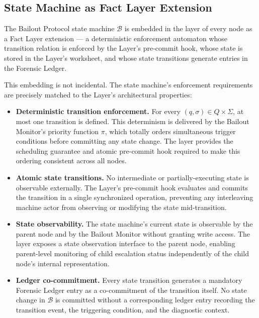 \subsection{State Machine as Fact Layer Extension}\label{sec:bailout-fml}

The Bailout Protocol state machine $\mathcal{B}$ is embedded in the \fact{} layer of every \bxthree{} node as a Fact Layer extension --- a deterministic enforcement automaton whose transition relation is enforced by the \fact{} Layer's pre-commit hook, whose state is stored in the \fact{} Layer's worksheet, and whose state transitions generate entries in the Forensic Ledger.

This embedding is not incidental. The state machine's enforcement requirements are precisely matched to the \fact{} Layer's architectural properties:

\begin{itemize}\itemsep=0pt
\item[(\textit{i})] \textbf{Deterministic transition enforcement.} For every $(q, \sigma) \in Q \times \Sigma$, at most one transition is defined. This determinism is delivered by the Bailout Monitor's priority function $\pi$, which totally orders simultaneous trigger conditions before committing any state change. The \fact{} layer provides the scheduling guarantee and atomic pre-commit hook required to make this ordering consistent across all nodes.

\item[(\textit{ii})] \textbf{Atomic state transitions.} No intermediate or partially-executing state is observable externally. The \fact{} Layer's pre-commit hook evaluates and commits the transition in a single synchronized operation, preventing any interleaving machine actor from observing or modifying the state mid-transition.

\item[(\textit{iii})] \textbf{State observability.} The state machine's current state is observable by the parent node and by the Bailout Monitor without granting write access. The \fact{} layer exposes a state observation interface to the parent node, enabling parent-level monitoring of child escalation status independently of the child node's internal representation.

\item[(\textit{iv})] \textbf{Ledger co-commitment.} Every state transition generates a mandatory Forensic Ledger entry as a co-commitment of the transition itself. No state change in $\mathcal{B}$ is committed without a corresponding ledger entry recording the transition event, the triggering condition, and the diagnostic context.
\end{itemize}

